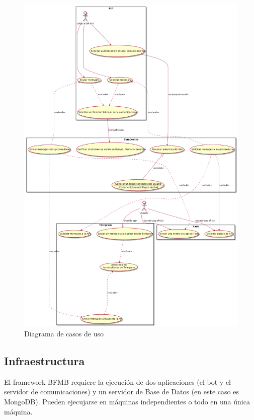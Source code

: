 \documentclass[spanish,12pt, a4paper, twoside]{paper}
\begin{document}
\begin{figure}
\centering
	\includegraphics[width=\textwidth]{recursos/usecases}
\caption{Diagrama de casos de uso}
\label{fig:Diagrama de casos de uso}
\end{figure}

\subsection{Infraestructura}

El framework BFMB requiere la ejecución de dos aplicaciones (el bot y el servidor de comunicaciones) y un servidor de Base de Datos (en este caso es MongoDB). Pueden ejecujarse en máquinas independientes o todo en una única máquina.
\newline
\end{document}

